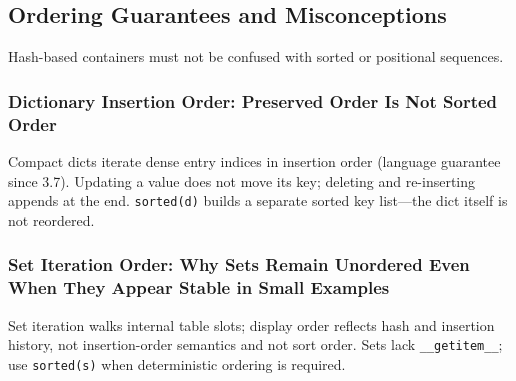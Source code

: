 \subsection{Ordering Guarantees and Misconceptions}

Hash-based containers must not be confused with sorted or positional sequences.

\subsubsection{Dictionary Insertion Order: Preserved Order Is Not Sorted Order}

Compact dicts iterate dense entry indices in insertion order (language guarantee since 3.7). Updating a value does not move its key; deleting and re-inserting appends at the end. \texttt{sorted(d)} builds a separate sorted key list---the dict itself is not reordered.

\subsubsection{Set Iteration Order: Why Sets Remain Unordered Even When They Appear Stable in Small Examples}

Set iteration walks internal table slots; display order reflects hash and insertion history, not insertion-order semantics and not sort order. Sets lack \texttt{\_\_getitem\_\_}; use \texttt{sorted(s)} when deterministic ordering is required.
